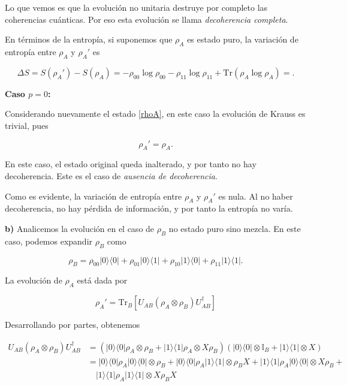 \documentclass[12pt]{article}
\makeatletter
\theoremstyle{definition}\@ifundefined{exercise}{\newtheorem{exercise}{Ejercicio}}{}%
\makeatother
\begin{document}
\begin{exercise}
Lo que vemos es que la evolución no unitaria destruye por completo las coherencias cuánticas. Por eso esta evolución se llama \textit{decoherencia completa}.

En términos de la entropía, si suponemos que $\rho_A$ es estado puro, la variación de entropía entre $\rho_A$ y $\rho_A'$ es 

$$\Delta S = S(\rho_A') - S(\rho_A) = -\rho_{00}\log\rho_{00} - \rho_{11}\log\rho_{11} + \text{Tr}(\rho_A\log\rho_A)= .$$

\textbf{Caso $p=0$:}

Considerando nuevamente el estado \ref{rhoA}, en este caso la evolución de Krauss es trivial, pues

$$\rho_A' = \rho_A.$$

En este caso, el estado original queda inalterado, y por tanto no hay decoherencia. Este es el caso de \textit{ausencia de decoherencia}.

Como es evidente, la variación de entropía entre $\rho_A$ y $\rho_A'$ es nula. Al no haber decoherencia, no hay pérdida de información, y por tanto la entropía no varía.




\end{exercise}



\textbf{b)} Analicemos la evolución en el caso de $\rho_B$ no estado puro sino mezcla. En este caso, podemos expandir $\rho_B$ como

$$\rho_B =  \rho_{00} |0\rangle\langle 0| + \rho_{01} |0\rangle\langle 1| + \rho_{10} |1\rangle\langle 0| + \rho_{11} |1\rangle\langle 1|. $$

La evolución de $\rho_A$ está dada por

$$    \rho_A' = \text{Tr}_B\left[U_{AB}(\rho_A \otimes \rho_B)U_{AB}^{\dagger}\right] $$

Desarrollando por partes, obtenemos

\begin{align*}
   U_{AB}(\rho_A \otimes \rho_B)U_{AB}^{\dagger} &= \left(|0\rangle\langle0|\rho_A \otimes \rho_B + |1\rangle\langle1|\rho_A \otimes X\rho_B \right) (|0\rangle\langle0| \otimes \mathbb{I}_B + |1\rangle\langle1| \otimes X) \\
  &= |0\rangle\langle0|\rho_A|0\rangle\langle0| \otimes \rho_B  + |0\rangle\langle0|\rho_A|1\rangle\langle1|\otimes \rho_BX +  |1\rangle\langle1|\rho_A|0\rangle\langle0| \otimes X\rho_B + \\
  & \quad |1\rangle\langle1|\rho_A|1\rangle\langle1| \otimes X\rho_BX 
\end{align*}
\end{document}
